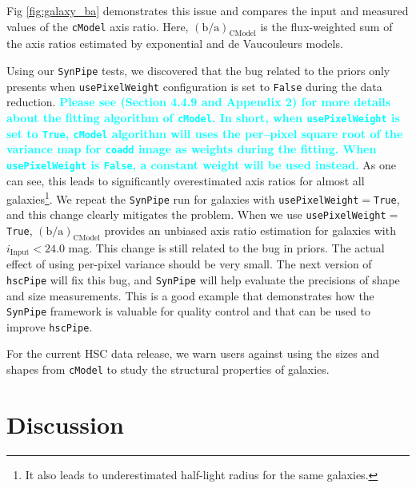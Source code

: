 \documentclass[useamsfonts]{pasj01}
\def\hscpipe{\texttt{hscPipe}}
\def\synpipe{\texttt{SynPipe}}
\def\cmodel{\texttt{cModel}}
\newcommand{\song}[1]{\textcolor{cyan} {\textbf{#1}}}
\begin{document}
    Fig \ref{fig:galaxy_ba} demonstrates this issue and compares the input and 
    measured values of the \cmodel{} axis ratio. 
    Here, $({\mathrm{b}/\mathrm{a}})_{\mathrm{CModel}}$ is the flux-weighted sum of the
    axis ratios estimated by exponential and de Vaucouleurs models.    
    
    Using our \synpipe{} tests, we discovered that the bug related to the priors only 
    presents when \texttt{usePixelWeight} configuration is set to \texttt{False} during 
    the data reduction. 
    \song{
    Please see \citet{Bosch2017} (Section 4.4.9 and Appendix 2) for more details about
    the fitting algorithm of \cmodel{}.  
    In short, when \texttt{usePixelWeight} is set to \texttt{True}, \cmodel{} algorithm 
    will uses the per--pixel square root of the variance map for \texttt{coadd} image as 
    weights during the fitting.  
    When \texttt{usePixelWeight} is \texttt{False}, a constant weight will be used 
    instead.
    }  
    As one can see, this leads to significantly overestimated axis ratios for almost
    all galaxies\footnote{It also leads to underestimated half-light radius for the same
    galaxies.}.
    We repeat the \synpipe{} run for galaxies with 
    \texttt{usePixelWeight}$=$\texttt{True}, and this change clearly mitigates
    the problem. 
    When we use \texttt{usePixelWeight}$=$\texttt{True},
    $({\mathrm{b}/\mathrm{a}})_{\mathrm{CModel}}$ provides an unbiased axis ratio 
    estimation for galaxies with $i_{\mathrm{Input}}< 24.0$ mag.
    This change is still related to the bug in priors.  
    The actual effect of using per-pixel variance should be very small.  
    The next version of \hscpipe{} will fix this bug, and \synpipe{} will help evaluate 
    the precisions of shape and size measurements. 
    This is a good example that demonstrates how the \synpipe{} framework is valuable  
    for quality control and that can be used to improve \hscpipe{}.

    For the current HSC data release, we warn users against using the sizes and shapes 
    from \cmodel{} to study the structural properties of galaxies.

\section{Discussion}
    \label{sec:discussion}
   
\end{document}
